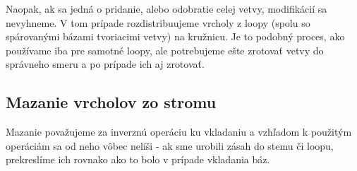 Naopak, ak sa jedná o pridanie, alebo odobratie celej vetvy, modifikácií sa nevyhneme.
V tom prípade rozdistribuujeme vrcholy z loopy (spolu so spárovanými bázami tvoriacimi
vetvy) na kružnicu. Je to podobný proces, ako používame iba pre samotné loopy,
ale potrebujeme ešte zrotovať vetvy do správneho smeru a po prípade ich aj zrotovať.






\subsection{Mazanie vrcholov zo stromu}

Mazanie považujeme za inverznú operáciu ku vkladaniu a vzhľadom k použitým operáciám
sa od neho vôbec nelíši - ak sme urobili zásah do stemu či loopu, prekreslíme
ich rovnako ako to bolo v prípade vkladania báz.




